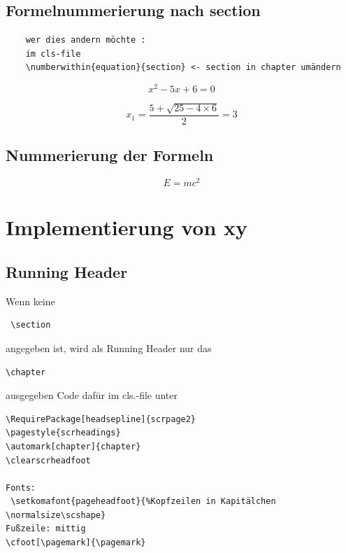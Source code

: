 \documentclass{like}
\begin{document}
	\section{Formelnummerierung nach section}
	
	\begin{verbatim}
	wer dies andern möchte : 
	im cls-file
	\numberwithin{equation}{section} <- section in chapter umändern
	\end{verbatim}
	
		\begin{equation} 
			x^2 - 5 x + 6 = 0
		\end{equation}
		
		\begin{equation}
			x_1 = \frac{5 + \sqrt{25 - 4 \times 6}}{2} = 3
		\end{equation}

		\section{Nummerierung der Formeln}
  		 \begin{equation}
    	  E=mc^2
   		\end{equation}
\chapter{Implementierung von xy} 

	\section{Running Header}
	Wenn keine
	\begin{verbatim}
 \section 
 \end{verbatim}
angegeben ist, wird als Running Header nur 
das\begin{verbatim}
\chapter 
\end{verbatim} ausgegeben
Code dafür im cls.-file unter
\begin{verbatim}
\RequirePackage[headsepline]{scrpage2}
\pagestyle{scrheadings} 
\automark[chapter]{chapter}
\clearscrheadfoot 

Fonts:
 \setkomafont{pageheadfoot}{%Kopfzeilen in Kapitälchen
\normalsize\scshape}        
Fußzeile: mittig
\cfoot[\pagemark]{\pagemark}                      
\end{verbatim}
		
\end{document}
